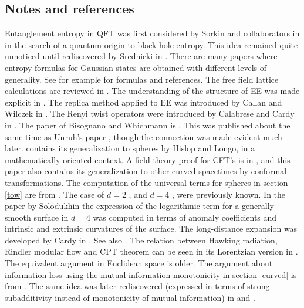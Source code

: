 \documentclass[12pt]{article}
\numberwithin{equation}{section}
\begin{document}
\subsection{Notes and references}
Entanglement entropy in QFT was first considered by Sorkin and collaborators in \cite{Sorkin:2014kta,Bombelli:1986rw} in the search of a quantum origin to black hole entropy. This idea remained quite unnoticed until rediscovered by Srednicki in \cite{Srednicki:1993im}. 
There are many papers where entropy formulas for Gaussian states are obtained with different levels of generality. See for example  \cite{peschel2009reduced} for formulas and references. 
The free field lattice calculations are reviewed in \cite{Casini:2009sr}. The understanding of the structure of EE was made explicit in  \cite{Liu:2012eea,Grover:2011fa}. The replica method applied to EE was introduced by Callan and Wilczek in \cite{Callan:1994py}. The Renyi twist operators were introduced by Calabrese and Cardy in \cite{Calabrese:2004eu}. The paper of Bisognano and Whichmann 
 is \cite{Bisognano:1975ih}. This was published about the same time as Unruh's paper  \cite{unruh1976notes}, though the connection was made evident much later.  
 \cite{Hislop:1981uh} contains its generalization to spheres by Hislop and Longo, in a mathematically oriented context. A field theory proof for CFT's is in \cite{Casini:2011kv}, and this paper also contains its generalization to other curved spacetimes by conformal transformations. The computation of the universal terms for spheres in section \ref{tow} are from \cite{Casini:2011kv}. The case of $d=2$ \cite{Holzhey:1994we}, and $d=4$ \cite{Solodukhin:2008dh}, were previously known. In the paper by Solodukhin \cite{Solodukhin:2008dh} the expression of the logarithmic term for a generally smooth surface in $d=4$ was computed in terms of anomaly coefficients and intrinsic and extrinsic curvatures of the surface. The long-distance expansion was developed by Cardy in \cite{Cardy.esferaslejanas}. See also \cite{Agon:2015ftl}. The relation between Hawking radiation, Rindler modular flow and CPT theorem can be seen in its Lorentzian version in \cite{sewell1982quantum}. The equivalent argument in Euclidean space is older. The argument about information loss using the mutual information monotonicity in section \ref{curved} is from \cite{Casini:2007dk}.        The same idea was later rediscovered (expressed in terms of strong subadditivity instead of monotonicity of mutual information) in \cite{Mathur:2009hf} and \cite{Almheiri:2012rt}. 
\end{document}
